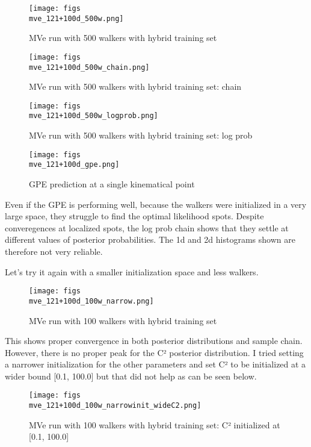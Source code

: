 \documentclass{article}
\begin{document}
\begin{figure}
\centering
\texttt{[image: figs\\mve\_121+100d\_500w.png]}
\caption{MVe run with 500 walkers with hybrid training set}
\label{fig:mve_121+100d_500w}
\end{figure}

\begin{figure}
\centering
\texttt{[image: figs\\mve\_121+100d\_500w\_chain.png]}
\caption{MVe run with 500 walkers with hybrid training set: chain}
\label{fig:mve_121+100d_500w_chain}
\end{figure}

\begin{figure}
\centering
\texttt{[image: figs\\mve\_121+100d\_500w\_logprob.png]}
\caption{MVe run with 500 walkers with hybrid training set: log prob}
\label{fig:mve_121+100d_500w_logprob}
\end{figure}

\begin{figure}
\centering
\texttt{[image: figs\\mve\_121+100d\_gpe.png]}
\caption{GPE prediction at a single kinematical point}
\label{fig:mve_121+100d_gpe}
\end{figure}

Even if the GPE is performing well, because the walkers were initialized in a very large space, they struggle to find the optimal likelihood spots. Despite converegences at localized spots, the log prob chain shows that they settle at different values of posterior probabilities. The 1d and 2d histograms shown are therefore not very reliable. 

Let's try it again with a smaller initialization space and less walkers.

\begin{figure}
\centering
\texttt{[image: figs\\mve\_121+100d\_100w\_narrow.png]}
\caption{MVe run with 100 walkers with hybrid training set}
\label{fig:mve_121+100d_100w_narrow}
\end{figure}

This shows proper convergence in both posterior distributions and sample chain. However, there is no proper peak for the C² posterior distribution. I tried setting a narrower initialization for the other parameters and set C² to be initialized at a wider bound [0.1, 100.0] but that did not help as can be seen below.

\begin{figure}
\centering
\texttt{[image: figs\\mve\_121+100d\_100w\_narrowinit\_wideC2.png]}
\caption{MVe run with 100 walkers with hybrid training set: C² initialized at [0.1, 100.0]}
\label{fig:mve_121+100d_100w_narrowinit_wideC2}
\end{figure}
\end{document}
